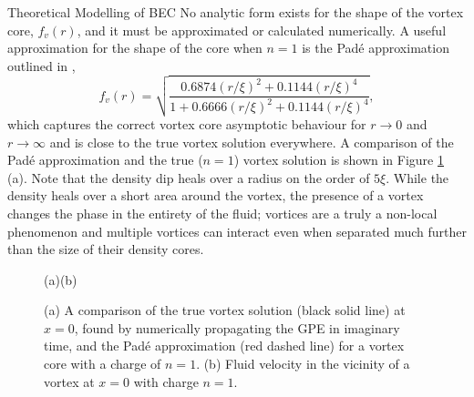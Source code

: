 \begin{chapter}{\label{cha:theoretical_model}Theoretical Modelling of BEC}
No analytic form exists for the shape of the vortex core, $f_v(r)$, and it must be approximated or calculated numerically. A useful approximation for the shape of the core when $n=1$ is the Pad\'e approximation outlined in \cite{berloff2004},
	\begin{equation}
		f_v(r) = \sqrt{\frac{0.6874(r/\xi)^2 + 0.1144(r/\xi)^4}{1+0.6666(r/\xi)^2+0.1144(r/\xi)^4}},
	\end{equation}
which captures the correct vortex core asymptotic behaviour for $r\rightarrow 0$ and $r\rightarrow\infty$ and is close to the true vortex solution everywhere. A comparison of the Pad\'e approximation and the true ($n=1$) vortex solution is shown in Figure \ref{fig_vortex} (a). Note that the density dip heals over a radius on the order of $5\xi$. While the density heals over a short area around the vortex, the presence of a vortex changes the phase in the entirety of the fluid; vortices are a truly a non-local phenomenon and multiple vortices can interact even when separated much further than the size of their density cores.

\begin{figure}[!ht]
	\hspace{-0.13\linewidth}(a)\hspace{0.45\linewidth}(b)\hspace{0.03\linewidth}\\
	\centering
  \caption{(a) A comparison of the true vortex solution (black solid line) at $x=0$, found by numerically propagating the GPE in imaginary time, and the Pad\'e approximation (red dashed line) for a vortex core with a charge of $n=1$. (b) Fluid velocity in the vicinity of a vortex at $x=0$ with charge $n=1$.}\label{fig_vortex}
 \end{figure}


\end{chapter}
